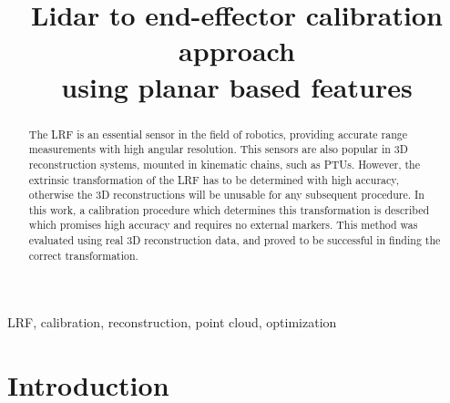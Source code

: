 \documentclass[conference]{IEEEtran}
\begin{document}
\title{Lidar to end-effector calibration approach\\ using planar based features}

\author{
\and
{}
\and
{}
}

\maketitle

\begin{abstract}
The LRF is an essential sensor in the field of robotics, providing accurate range measurements with high angular resolution. This sensors are also popular in 3D reconstruction systems, mounted in kinematic chains, such as PTUs. However, the extrinsic transformation of the LRF has to be determined with high accuracy, otherwise the 3D reconstructions will be unusable for any subsequent procedure. In this work, a calibration procedure which determines this transformation is described which promises high accuracy and requires no external markers. This method was evaluated using real 3D reconstruction data, and proved to be successful in finding the correct transformation. 
\end{abstract}

\begin{IEEEkeywords}
LRF, calibration, reconstruction, point cloud, optimization
\end{IEEEkeywords}

\section{Introduction}\label{section:introduction}
\end{document}
